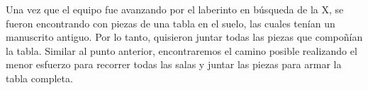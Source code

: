 Una vez que el equipo fue avanzando por el laberinto en b\'usqueda de la X, se fueron encontrando con piezas de una tabla en el suelo, las cuales ten\'ian un manuscrito antiguo. Por lo tanto, quisieron juntar todas las piezas que compoñ\'ian la tabla. Similar al punto anterior, encontraremos el camino posible realizando el menor esfuerzo para recorrer todas las salas y juntar las piezas para armar la tabla completa.\\


